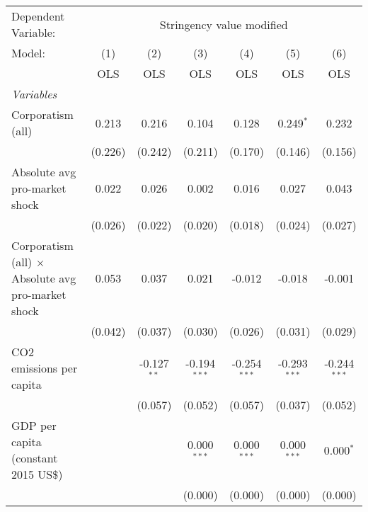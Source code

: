 
\begingroup
\centering
\begin{tabular}{lcccccc}
   \toprule
   Dependent Variable: & \multicolumn{6}{c}{Stringency value modified}\\
   Model:                                                    & (1)     & (2)           & (3)            & (4)            & (5)            & (6)\\  
                                                             &  OLS    & OLS           & OLS            & OLS            & OLS            & OLS\\  
   \midrule
   \emph{Variables}\\
   Corporatism (all)                                         & 0.213   & 0.216         & 0.104          & 0.128          & 0.249$^{*}$    & 0.232\\   
                                                             & (0.226) & (0.242)       & (0.211)        & (0.170)        & (0.146)        & (0.156)\\   
   Absolute avg pro-market shock                             & 0.022   & 0.026         & 0.002          & 0.016          & 0.027          & 0.043\\   
                                                             & (0.026) & (0.022)       & (0.020)        & (0.018)        & (0.024)        & (0.027)\\   
   Corporatism (all) $\times$ Absolute avg pro-market shock  & 0.053   & 0.037         & 0.021          & -0.012         & -0.018         & -0.001\\   
                                                             & (0.042) & (0.037)       & (0.030)        & (0.026)        & (0.031)        & (0.029)\\   
   CO2 emissions per capita                                  &         & -0.127$^{**}$ & -0.194$^{***}$ & -0.254$^{***}$ & -0.293$^{***}$ & -0.244$^{***}$\\   
                                                             &         & (0.057)       & (0.052)        & (0.057)        & (0.037)        & (0.052)\\   
   GDP per capita (constant 2015 US\$)                       &         &               & 0.000$^{***}$  & 0.000$^{***}$  & 0.000$^{***}$  & 0.000$^{*}$\\   
                                                             &         &               & (0.000)        & (0.000)        & (0.000)        & (0.000)\\   

\end{tabular}
